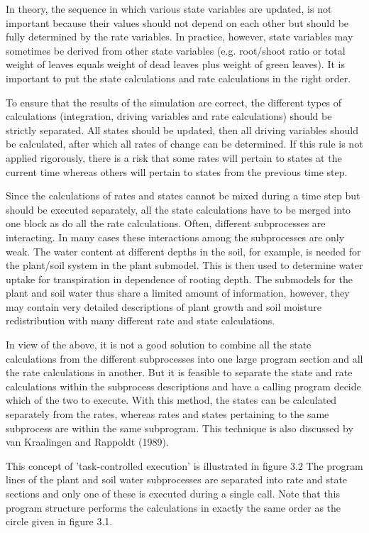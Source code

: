 \documentclass[11pt]{article}
\begin{document}
\bigskip
\bigskip
In theory, the sequence in which various state variables are updated, is not important
because their values should not depend on each other but should be fully determined by
the rate variables. In practice, however, state variables may sometimes be derived from
other state variables (e.g. root/shoot ratio or total weight of leaves equals weight of dead
leaves plus weight of green leaves). It is important to put the state calcula\-tions and rate
calculations in the right order.

\bigskip
To ensure that the results of the simulation are correct, the different types of calculations
(integration, driving variables and rate calcula\-tions) should be strictly separated. All states
should be updated, then all driving variables should be calculat\-ed, after which all rates of
change can be determined. If this rule is not applied rigorous\-ly, there is a risk that some
rates will pertain to states at the current time whereas others will pertain to states from
the previous time step.

\bigskip
Since the calculations of rates and states cannot be mixed during a time step but should be
executed separately, all the state calculations have to be merged into one block as do all
the rate calculations. Often, different subprocesses are interacting. In many cases these
interactions among the subprocesses are only weak. The water content at different depths
in the soil, for example, is needed for the plant/soil system in the plant submodel. This is
then used to deter\-mine water uptake for transpiration in dependence of rooting depth. The
submodels for the plant and soil water thus share a limited amount of information,
however, they may contain very detailed descriptions of plant growth and soil moisture
redistribution with many different rate and state calcula\-tions.

\bigskip
In view of the above, it is not a good solution to combine all the state calculations from
the different subprocesses into one large program section and all the rate calculations in
another. But it is feasible to separate the state and rate calculations within the subprocess
descriptions and have a calling program decide which of the two to execute. With this
method, the states can be calculated separately from the rates, whereas rates and states
pertaining to the same subprocess are within the same subprogram. This technique is also
discussed by van Kraalingen and Rappoldt (1989).

\bigskip
This concept of 'task-controlled execution' is illustrated in figure 3.2 The program lines
of the plant and soil water subprocesses are separated into rate and state sections and only
one of these is executed during a single call. Note that this program structure performs
the calculations in exactly the same order as the circle given in figure 3.1.
\end{document}
